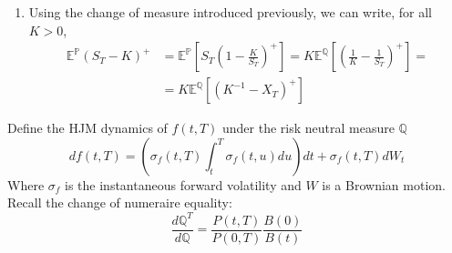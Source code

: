 \documentclass[12pt,a4paper]{exam}
\begin{document}
\begin{questions}
\begin{solution}
\begin{enumerate}[label=(\alph*),font=\itshape]
Under $\mathbb{Q}$, the process $X$ is therefore a geometric Brownian motion. 
\item Using the change of measure introduced previously, we can write, for all $K>0$,
  \begin{equation*}
    \begin{aligned}
      \mathbb{E}^{\mathbb{P}}(S_T-K)^+ & = \mathbb{E}^{\mathbb{P}}\left[S_T\left(1-\frac{K}{S_T}\right)^+\right] = K \mathbb{E}^{\mathbb{Q}}\left[\left(\frac{1}{K}-\frac{1}{S_T}\right)^+\right] = \\
      & = K\mathbb{E}^{\mathbb{Q}}\left[(K^{-1}-X_T)^+\right]
    \end{aligned}
\end{equation*}
\end{enumerate}
\end{solution}

Define the HJM dynamics of $f(t,T)$ under the risk neutral measure $\mathbb{Q}$
\begin{equation*}
    df(t,T) = \left( \sigma_f(t,T) \int_t^T  \sigma_f(t,u) du \right) dt + \sigma_f(t,T)dW_t
\end{equation*}
Where $\sigma_f$ is the instantaneous forward volatility and $W$ is a Brownian motion. Recall the change of numeraire equality:
\begin{equation*}
    \frac{d \mathbb{Q}^T}{d \mathbb{Q}} = \frac{P(t,T)}{P(0,T)} \frac{B(0)}{B(t)}
\end{equation*}


\end{questions}
\end{document}
